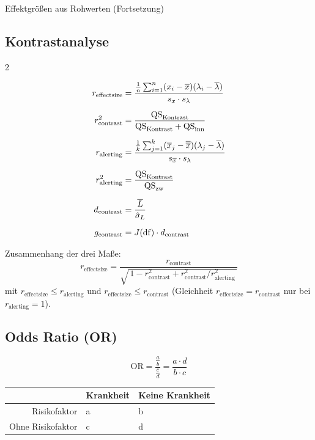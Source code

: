 \begin{formulaBoxContinuation}{Effektgrößen aus Rohwerten (Fortsetzung)}{}
\subsection*{Kontrastanalyse}
\begin{multicols}{2}

\begin{align*}
r_{\mathrm{effectsize}}
  &= \frac{\frac{1}{n} \sum_{i=1}^n (x_i - \overline{x})(\lambda_i - \overline{\lambda})}
          {s_x \cdot s_\lambda} \\[0.6em]
r^2_{\mathrm{contrast}}
  &= \frac{\mathrm{QS}_{\mathrm{Kontrast}}}
          {\mathrm{QS}_{\mathrm{Kontrast}} + \mathrm{QS}_{\mathrm{inn}}} \\[0.6em]
r_{\mathrm{alerting}}
  &= \frac{\frac{1}{k} \sum_{j=1}^k (\overline{x}_j - \overline{\overline{x}})(\lambda_j - \overline{\lambda})}
          {s_{\overline{x}} \cdot s_\lambda} \\[0.6em]
r^2_{\mathrm{alerting}}
  &= \frac{\mathrm{QS}_{\mathrm{Kontrast}}}{\mathrm{QS}_{\mathrm{zw}}} \\[0.6em]
d_{\mathrm{contrast}}
  &= \frac{\overline{L}}{\hat{\sigma}_{L}} \\[0.6em]
g_{\mathrm{contrast}}
  &= J(\mathrm{df})\cdot d_{\mathrm{contrast}}
\end{align*}

Zusammenhang der drei Maße:
\[
r_{\mathrm{effectsize}} = \frac{r_{\mathrm{contrast}}}{\sqrt{\,1 - r^2_{\mathrm{contrast}} + r^2_{\mathrm{contrast}}/r^2_{\mathrm{alerting}}\,}}
\]
mit $r_{\mathrm{effectsize}} \le r_{\mathrm{alerting}}$ und $r_{\mathrm{effectsize}} \le r_{\mathrm{contrast}}$ (Gleichheit $r_{\mathrm{effectsize}} = r_{\mathrm{contrast}}$ nur bei $r_{\mathrm{alerting}} = 1$).

\subsection*{Odds Ratio (OR)}

\[
\mathrm{OR}= \frac{\frac{a}{b}}{\frac{c}{d}}
= \frac{a \cdot d}{b \cdot c}
\]

\begin{tabular}{@{} r ll @{}}
\toprule
& Krankheit & Keine Krankheit \\
\midrule
Risikofaktor        & a & b \\
Ohne Risikofaktor   & c & d \\
\bottomrule
\end{tabular}


\end{multicols}
\end{formulaBoxContinuation}

